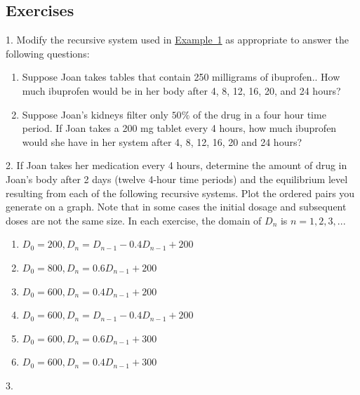 \documentclass[10pt,]{book}
\theoremstyle{plain}
\theoremstyle{definition}
\theoremstyle{definition}
\theoremstyle{definition}
\numberwithin{equation}{section}
\begin{document}
\subsection[{Exercises}]{Exercises}\label{exercises-2}
\begin{exerciselist}
\item[1.]\hypertarget{exercise-3}{}\hypertarget{p-21}{}%
Modify the recursive  system  used in \hyperref[ibuprofen-example-one-dose]{Example~1} as appropriate to answer the following questions: \leavevmode%
\begin{enumerate}[label=(\alph*)]
\item\hypertarget{li-7}{}Suppose Joan takes tables that contain 250 milligrams of ibuprofen..  How much ibuprofen would be in her body after 4, 8, 12, 16, 20, and 24 hours?%
\item\hypertarget{li-8}{}Suppose Joan’s kidneys filter only \(50\%\) of the drug in a four hour time period.  If Joan takes a 200 mg tablet every 4 hours, how much ibuprofen would she  have in her system after  4, 8, 12, 16, 20 and 24 hours?%
\end{enumerate}
%
\par\smallskip
\item[2.]\hypertarget{exercise-4}{}\hypertarget{p-22}{}%
If Joan takes her medication every 4 hours, determine the amount of drug in Joan’s body after 2 days (twelve  4-hour time periods) and the equilibrium level resulting from each of the following recursive systems.  Plot the ordered pairs you generate on a graph.  Note that in some cases the initial dosage and subsequent doses are not the same size.  In each exercise, the domain of \(D_n\) is \(n=1,2,3, ...\) \leavevmode%
\begin{enumerate}[label=(\alph*)]
\item\hypertarget{li-9}{}\(D_0=200, D_n=D_{n-1} - 0.4D_{n-1} + 200\)%
\item\hypertarget{li-10}{}\(D_0=800, D_n=0.6D_{n-1} + 200\)%
\item\hypertarget{li-11}{}\(D_0=600, D_n=0.4D_{n-1} + 200\)%
\item\hypertarget{li-12}{}\(D_0=600, D_n=D_{n-1} - 0.4D_{n-1} + 200\)%
\item\hypertarget{li-13}{}\(D_0=600, D_n=0.6D_{n-1} + 300\)%
\item\hypertarget{li-14}{}\(D_0=600, D_n=0.4D_{n-1} + 300\)%
\end{enumerate}
%
\par\smallskip
\item[3.]\hypertarget{exercise-5}{}\hypertarget{p-23}{}%

\end{exerciselist}
\end{document}
